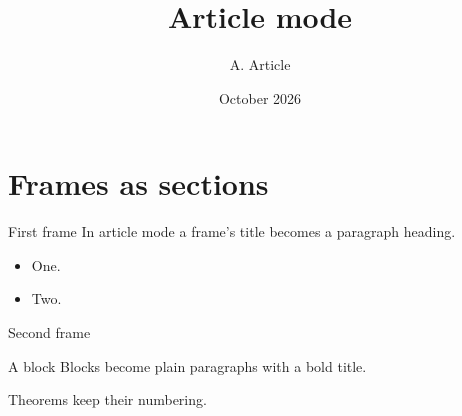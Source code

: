 \documentclass{article}
\title{Article mode}
\author{A. Article}
\date{October 2026}
\begin{document}
\maketitle
\section{Frames as sections}
\begin{frame}{First frame}
  In article mode a frame's title becomes a paragraph heading.
  \begin{itemize}
    \item<1-> One.
    \item<2-> Two.
  \end{itemize}
\end{frame}
\begin{frame}{Second frame}
  \begin{block}{A block}
    Blocks become plain paragraphs with a bold title.
  \end{block}
  \begin{theorem}
    Theorems keep their numbering.
  \end{theorem}
\end{frame}
\end{document}

